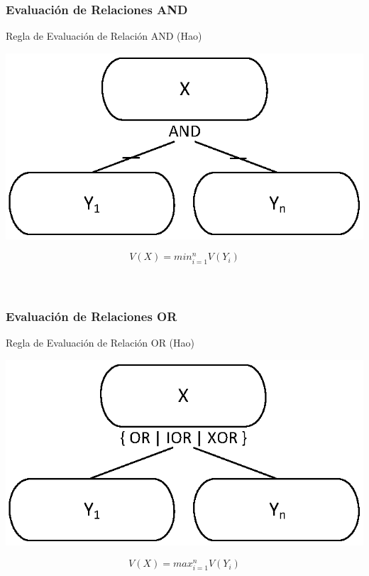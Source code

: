 \documentclass[handout,a4paper,slidestop,xcolor=pst,dvips,blue]{beamer}
\begin{document}
\begin{frame}[c]
    \frametitle{Evaluación de Relaciones AND}
    \begin{block}{Regla de Evaluación de Relación AND (Hao)}
        \begin{center}
    	   \includegraphics[width=0.4\linewidth,keepaspectratio=true]{images/influences/andRelationship.eps}
        \end{center}
        \begin{equation*}
        V(X) = min_{i=1}^{n} V(Y_{i})
        \end{equation*}
        \ \\ \ \\
    \end{block}
\end{frame}

\begin{frame}[c]
    \frametitle{Evaluación de Relaciones OR}
    \begin{block}{Regla de Evaluación de Relación OR (Hao)}
        \begin{center}
    	   \includegraphics[width=0.4\linewidth,keepaspectratio=true]{images/influences/orRelationship.eps}
        \end{center}
        \begin{equation*}
        V(X) = max_{i=1}^{n} V(Y_{i})
        \end{equation*}
        \ \\ \ \\
    \end{block}
\end{frame}
\end{document}
